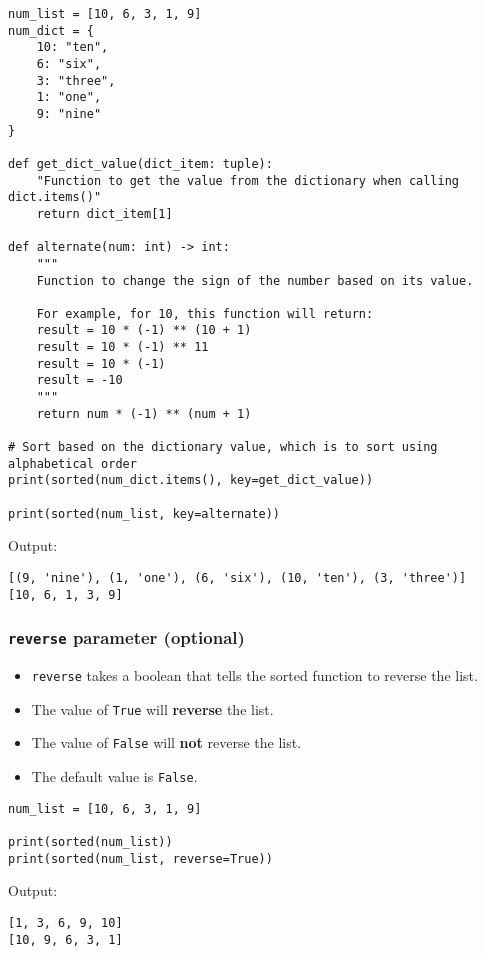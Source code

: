 \documentclass[11pt]{article}
\begin{document}
\begin{verbatim}
num_list = [10, 6, 3, 1, 9]
num_dict = {
    10: "ten",
    6: "six",
    3: "three",
    1: "one",
    9: "nine"
}

def get_dict_value(dict_item: tuple):
    "Function to get the value from the dictionary when calling dict.items()"
    return dict_item[1]

def alternate(num: int) -> int:
    """
    Function to change the sign of the number based on its value.

    For example, for 10, this function will return:
    result = 10 * (-1) ** (10 + 1)
    result = 10 * (-1) ** 11
    result = 10 * (-1)
    result = -10
    """
    return num * (-1) ** (num + 1)

# Sort based on the dictionary value, which is to sort using alphabetical order
print(sorted(num_dict.items(), key=get_dict_value))

print(sorted(num_list, key=alternate))
\end{verbatim}

 \noindent Output:

\label{orgd21021d}
\begin{verbatim}
[(9, 'nine'), (1, 'one'), (6, 'six'), (10, 'ten'), (3, 'three')]
[10, 6, 1, 3, 9]
\end{verbatim}
\subsubsection{\texttt{reverse} parameter (optional)}
\label{sec:org00f0a82}
\begin{itemize}
\item \texttt{reverse} takes a boolean that tells the sorted function to reverse the list.
\item The value of \texttt{True} will \textbf{reverse} the list.
\item The value of \texttt{False} will \textbf{not} reverse the list.
\item The default value is \texttt{False}.
\end{itemize}

\begin{verbatim}
num_list = [10, 6, 3, 1, 9]

print(sorted(num_list))
print(sorted(num_list, reverse=True))
\end{verbatim}

 \noindent Output:

\label{org9e0f67b}
\begin{verbatim}
[1, 3, 6, 9, 10]
[10, 9, 6, 3, 1]
\end{verbatim}
\end{document}
